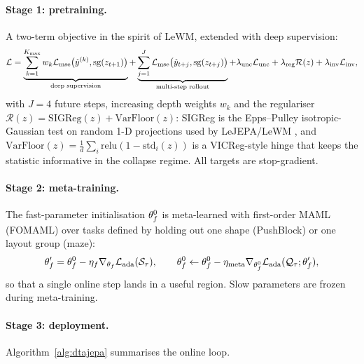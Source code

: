 \paragraph{Stage 1: pretraining.} A two-term objective in the spirit of LeWM, extended with
deep supervision:
\begin{equation}
\mathcal L = \underbrace{\sum_{k=1}^{K_{\max}} w_k \mathcal L_{\mathrm{mse}}\big(\hat{y}^{(k)},
\mathrm{sg}(z_{t+1})\big)}_{\text{deep supervision}}
+ \underbrace{\sum_{j=1}^{J}\mathcal L_{\mathrm{mse}}\big(\hat{y}_{t+j},\mathrm{sg}(z_{t+j})\big)}_{\text{multi-step rollout}}
+ \lambda_{\mathrm{unc}}\mathcal L_{\mathrm{unc}}
+ \lambda_{\mathrm{reg}}\mathcal R(z)
+ \lambda_{\mathrm{inv}}\mathcal L_{\mathrm{inv}},
\end{equation}
with $J=4$ future steps, increasing depth weights $w_k$ and the regulariser
$\mathcal R(z)=\mathrm{SIGReg}(z)+\mathrm{VarFloor}(z)$: SIGReg is the Epps--Pulley
isotropic-Gaussian test on random 1-D projections used by LeJEPA/LeWM
\cite{balestriero-2025-lejepa}, and $\mathrm{VarFloor}(z)=\frac1d\sum_i\mathrm{relu}(1-\mathrm{std}_i(z))$
is a VICReg-style \cite{bardes-2022-vicreg} hinge that keeps the statistic informative in the
collapse regime. All targets are stop-gradient.

\paragraph{Stage 2: meta-training.} The fast-parameter initialisation $\theta_f^0$ is meta-learned
with first-order MAML (FOMAML) over tasks defined by holding out one shape (PushBlock) or one
layout group (maze):
\begin{equation}
\theta_f' = \theta_f^0-\eta_f\nabla_{\theta_f}\mathcal L_{\mathrm{ada}}(\mathcal S_\tau),\qquad
\theta_f^0 \leftarrow \theta_f^0-\eta_{\mathrm{meta}}\nabla_{\theta_f^0}\mathcal L_{\mathrm{ada}}(\mathcal Q_\tau;\theta_f'),
\end{equation}
so that a single online step lands in a useful region. Slow parameters are frozen during
meta-training.

\paragraph{Stage 3: deployment.} Algorithm~\ref{alg:dtajepa} summarises the online loop.

